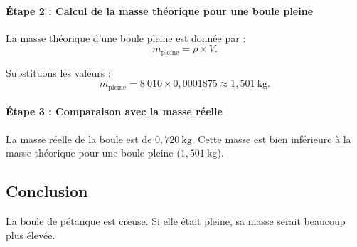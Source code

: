 \documentclass[a4paper,12pt]{article}
\begin{document}
\paragraph{Étape 2 : Calcul de la masse théorique pour une boule pleine}
La masse théorique d'une boule pleine est donnée par :
\[
m_{\text{pleine}} = \rho \times V.
\]

Substituons les valeurs :
\[
m_{\text{pleine}} = 8~010 \times 0,0001875 \approx 1,501~\text{kg}.
\]

\paragraph{Étape 3 : Comparaison avec la masse réelle}
La masse réelle de la boule est de $0,720~\text{kg}$. Cette masse est bien inférieure à la masse théorique pour une boule pleine ($1,501~\text{kg}$).

\subsection*{Conclusion}
La boule de pétanque est creuse. Si elle était pleine, sa masse serait beaucoup plus élevée.
\end{document}
